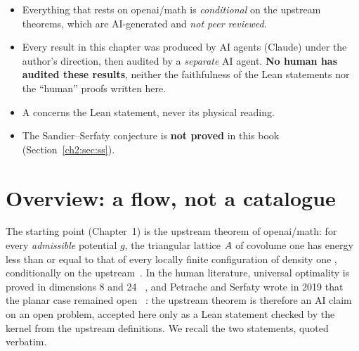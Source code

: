 \begin{warnbox}
\begin{itemize}[leftmargin=1.2em,itemsep=2pt]
\item Everything that rests on openai/math is \emph{conditional} on the upstream theorems, which are AI-generated and
\emph{not peer reviewed}.
\item Every result in this chapter was produced by AI agents (Claude) under the author's direction, then audited by a
\emph{separate} AI agent. \textbf{No human has audited these results}, neither the faithfulness of the Lean statements
nor the ``human'' proofs written here.
\item A \tierA{} concerns the Lean statement, never its physical reading.
\item The Sandier--Serfaty conjecture is \textbf{not proved} in this book (Section~\ref{ch2:sec:ss}).
\end{itemize}
\end{warnbox}

\section{Overview: a flow, not a catalogue}\label{ch2:sec:flux}

The starting point (Chapter~1) is the upstream theorem  of openai/math: for every
\emph{admissible} potential $g$, the triangular lattice $A$ of covolume one has energy less than or equal to that of
every locally finite configuration of density one \tierA{}, conditionally on the upstream~\cite{oai}. In the human
literature, universal optimality is proved in dimensions 8 and 24~\cite{ckmrv} \tierL, and Petrache and Serfaty wrote in
2019 that the planar case remained open~\cite{ch2ps} \tierL: the upstream theorem is therefore an AI claim on an open
problem, accepted here only as a Lean statement checked by the kernel from the upstream definitions. We recall the two
statements, quoted verbatim.

